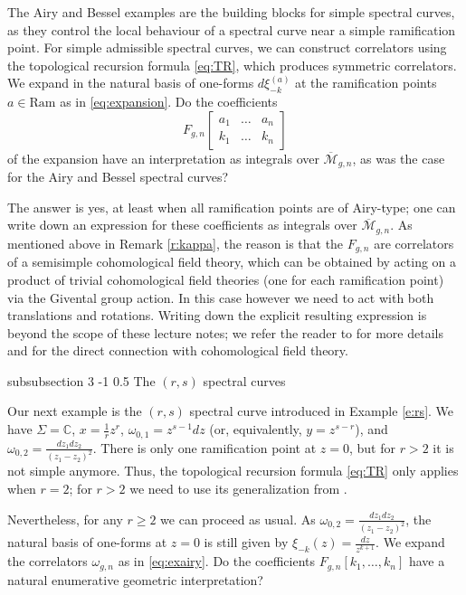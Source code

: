 \documentclass[reqno,oneside,11pt]{amsart}
\makeatletter
\theoremstyle{plain}
\theoremstyle{definition}
\theoremstyle{remark}
\numberwithin{equation}{section}
\renewcommand{\subsubsection}{\@startsection
{subsubsection}%
{3}%
{\z@}%
{-1\baselineskip}%
{0.5\baselineskip}%
{\normalfont \it \normalsize}} %
\newcommand{\Ra}{\text{Ram}}
\makeatother
\begin{document}
The Airy and Bessel examples are the building blocks for simple spectral curves, as they control the local behaviour of a spectral curve near a simple ramification point. For simple admissible spectral curves, we can construct correlators using the topological recursion formula \eqref{eq:TR}, which produces symmetric correlators. We expand in the natural basis of one-forms $d \xi_{-k}^{(a)}$ at the ramification points $a \in \Ra$ as in \eqref{eq:expansion}. Do the coefficients
\begin{equation}
F_{g,n} \begin{bmatrix} a_1 & \ldots & a_n \\ k_1 & \ldots & k_n \end{bmatrix} 
\end{equation}
of the expansion have an interpretation as integrals over $\overline{\mathcal{M}}_{g,n}$, as was the case for the Airy and Bessel spectral curves?

The answer is yes, at least when all ramification points are of Airy-type; one can write down an expression for these coefficients as integrals over $\overline{\mathcal{M}}_{g,n}$.  As mentioned above in Remark \ref{r:kappa}, the reason is that the $F_{g,n}$ are correlators of a semisimple cohomological field theory, which can be obtained by acting on a product of trivial cohomological field theories (one for each ramification point) via the Givental group action. In this case however we need to act with both translations and rotations. Writing down the explicit resulting expression is beyond the scope of these lecture notes; we refer the reader to \cite{Ey11,DOSS12}  for more details and for the direct connection with cohomological field theory.

\subsubsection{The $(r,s)$ spectral curves}

Our next example is the $(r,s)$ spectral curve introduced in Example \ref{e:rs}. We have $\Sigma = \mathbb{C}$, $x = \frac{1}{r} z^r$, $\omega_{0,1} = z^{s-1} dz$ (or, equivalently, $y=z^{s-r}$), and $\omega_{0,2} = \frac{dz_1 dz_2}{(z_1-z_2)^2}$. There is only one ramification point at $z=0$, but for $r>2$ it is not simple anymore. Thus, the topological recursion formula \eqref{eq:TR} only applies when $r=2$; for $r>2$ we need to use its generalization from \cite{BE13}.

Nevertheless, for any $r \geq 2$ we can proceed as usual. As $\omega_{0,2} = \frac{dz_1 dz_2}{(z_1-z_2)^2}$, the natural basis of one-forms at $z=0$ is still given by $ \xi_{-k}(z) =  \frac{d z}{z^{k+1}}$. We expand the correlators $\omega_{g,n}$ as in \eqref{eq:exairy}. Do the coefficients $F_{g,n}[k_1,\ldots,k_n]$ have a natural enumerative geometric interpretation?
\end{document}
